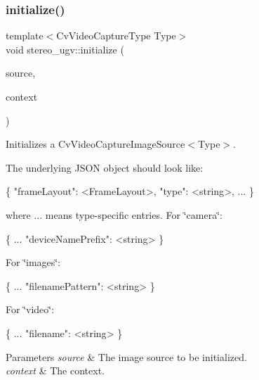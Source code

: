 \subsubsection{\texorpdfstring{initialize()}{initialize()}\hspace{0.1cm}{\footnotesize\ttfamily [8/8]}}
{\footnotesize\ttfamily template$<$Cv\+Video\+Capture\+Type Type$>$ \\
void stereo\+\_\+ugv\+::initialize (\begin{DoxyParamCaption}\item[{\hyperlink{classstereo__ugv_1_1CvVideoCaptureImageSource}{Cv\+Video\+Capture\+Image\+Source}$<$ Type $>$ $\ast$}]{source,  }\item[{const \hyperlink{classstereo__ugv_1_1Context}{Context} \&}]{context }\end{DoxyParamCaption})\hspace{0.3cm}{\ttfamily [inline]}}



Initializes a Cv\+Video\+Capture\+Image\+Source$<$\+Type$>$. 

The underlying J\+S\+ON object should look like\+: 
\begin{DoxyCode}
\{
  \textcolor{stringliteral}{"frameLayout"}: <FrameLayout>,
  \textcolor{stringliteral}{"type"}: <\textcolor{keywordtype}{string}>,
  ...
\}
\end{DoxyCode}
 where ... means type-\/specific entries. For \char`\"{}camera\char`\"{}\+: 
\begin{DoxyCode}
\{
  ...
  \textcolor{stringliteral}{"deviceNamePrefix"}: <\textcolor{keywordtype}{string}>
\}
\end{DoxyCode}
 For \char`\"{}images\char`\"{}\+: 
\begin{DoxyCode}
\{
  ...
  \textcolor{stringliteral}{"filenamePattern"}: <\textcolor{keywordtype}{string}>
\}
\end{DoxyCode}
 For \char`\"{}video\char`\"{}\+: 
\begin{DoxyCode}
\{
  ...
  \textcolor{stringliteral}{"filename"}: <\textcolor{keywordtype}{string}>
\}
\end{DoxyCode}
 
\begin{DoxyParams}{Parameters}
{\em source} & The image source to be initialized. \\
\hline
{\em context} & The context. \\
\hline
\end{DoxyParams}
\mbox{\label{namespacestereo__ugv_a68c69a3de2a5351d41ce848792c213f4}} 
